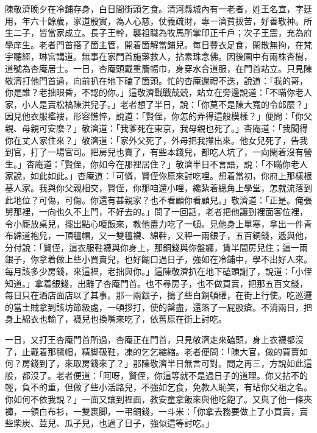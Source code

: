 陳敬濟晚夕在冷鋪存身，白日間街頭乞食。清河縣城內有一老者，姓王名宣，字廷用，年六十餘歲，家道殷實，為人心慈，仗義疏財，專一濟貧拔苦，好善敬神。所生二子，皆當家成立。長子王幹，襲祖職為牧馬所掌印正千戶；次子王震，充為府學庠生。老者門首搭了箇主管，開着箇解當鋪兒。每日豐衣足食，閑散無拘，在梵宇聽經，琳宮講道。無事在家門首施藥救人，拈素珠念佛。因後園中有兩株杏樹，道號為杏庵居士。一日，杏庵頭戴重簷幅巾，身穿水合道服，在門首站立。只見陳敬濟打他門首過，向前扒在地下磕了箇頭。忙的杏庵還禮不迭，說道：「我的哥，你是誰？老拙眼昏，不認的你。」這敬濟戰戰兢兢，站立在旁邊說道：「不瞞你老人家，小人是賣松槁陳洪兒子。」老者想了半日，說：「你莫不是陳大寬的令郎麼？」{}因見他衣服襤褸，形容憔悴，說道：「賢侄，你怎的弄得這般模樣？」便問：「你父親、母親可安麼？」敬濟道：「我爹死在東京，我母親也死了。」杏庵道：「我聞得你在丈人家住來？」敬濟道：「家外父死了，外母把我攆出來。他女兒死了，告我到官，打了一場官司。把房兒也賣了，有些本錢兒，都吃人坑了，一向閑着沒有營生。」杏庵道：「賢侄，你如今在那裡居住？」敬濟半日不言語，說：「不瞞你老人家說，如此如此。」{}杏庵道：「可憐，賢侄你原來討吃哩。想着當初，你府上那樣根基人家。我與你父親相交，賢侄，你那咱還小哩，纔紮着總角上學堂，怎就流落到此地位？可傷，可傷。你還有甚親家？也不看顧你看顧兒。」敬濟道：「正是。俺張舅那裡，一向也久不上門，不好去的。」問了一回話，老者把他讓到裡面客位裡，令小厮放桌兒，擺出點心嗄飯來，教他盡力吃了一頓。見他身上單寒，拿出一件青布綿道袍兒，一頂氊帽，又一雙氊襪、綿鞋，又秤一兩銀子，五百銅錢，遞與他，分付說：「賢侄，這衣服鞋襪與你身上，那銅錢與你盤纏，賃半間房兒住；這一兩銀子，你拿着做上些小買賣兒，也好餬口過日子，強如在冷鋪中，學不出好人來。{}每月該多少房錢，來這裡，老拙與你。」這陳敬濟扒在地下磕頭謝了，說道：「小侄知道。」拿着銀錢，出離了杏庵門首。也不尋房子，也不做買賣，把那五百文錢，每日只在酒店面店以了其事。{}那一兩銀子，搗了些白銅頓礶，在街上行使。{}吃巡邏的當土賊拿到該坊節級處，一頓拶打，使的罄盡，還落了一屁股瘡。不消兩日，把身上綿衣也輸了，襪兒也換嘴來吃了，依舊原在街上討吃。

一日，又打王杏庵門首所過，杏庵正在門首，只見敬濟走來磕頭，身上衣襪都沒了，止戴着那氊帽，精脚靸鞋，凍的乞乞縮縮。老者便問：「陳大官，做的買賣如何？房錢到了，來取房錢來了？」那陳敬濟半日無言可對。問之再三，方說如此這般，都沒了。老者便道：「阿呀，賢侄，你這等就不是過日子的道理。你又拈不的輕，負不的重，但做了些小活路兒，不強如乞食，免教人恥笑，有玷你父祖之名。你如何不依我說？」一面又讓到裡面，教安童拿飯來與他吃飽了。又與了他一條夾褲，一領白布衫，一雙裹脚，一弔銅錢，一斗米：「你拿去務要做上了小買賣，賣些柴炭、荳兒、瓜子兒，也過了日子，強似這等討吃。」


